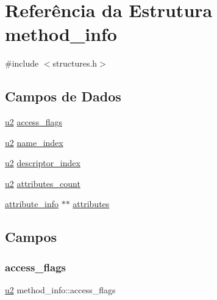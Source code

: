 \hypertarget{structmethod__info}{}\section{Referência da Estrutura method\+\_\+info}
\label{structmethod__info}


{\ttfamily \#include $<$structures.\+h$>$}

\subsection*{Campos de Dados}
\begin{DoxyCompactItemize}
\item 
\hyperlink{lista__operandos_8h_a732cde1300aafb73b0ea6c2558a7a54f}{u2} \hyperlink{structmethod__info_a3b657027a141cdbc94ded28607c98be5}{access\+\_\+flags}
\item 
\hyperlink{lista__operandos_8h_a732cde1300aafb73b0ea6c2558a7a54f}{u2} \hyperlink{structmethod__info_ab91d62d0658b77bba83f6bb685e3bbb9}{name\+\_\+index}
\item 
\hyperlink{lista__operandos_8h_a732cde1300aafb73b0ea6c2558a7a54f}{u2} \hyperlink{structmethod__info_a7713103e0c8d060630ad62774fb9be37}{descriptor\+\_\+index}
\item 
\hyperlink{lista__operandos_8h_a732cde1300aafb73b0ea6c2558a7a54f}{u2} \hyperlink{structmethod__info_ad9e5e1e2fc850806addadd6deab8565d}{attributes\+\_\+count}
\item 
\hyperlink{structattribute__info}{attribute\+\_\+info} $\ast$$\ast$ \hyperlink{structmethod__info_ab6e323f51c4f05e92c09e3ac5e7e07dc}{attributes}
\end{DoxyCompactItemize}


\subsection{Campos}
\mbox{\label{structmethod__info_a3b657027a141cdbc94ded28607c98be5}} 
\subsubsection{\texorpdfstring{access\+\_\+flags}{access\_flags}}
{\footnotesize\ttfamily \hyperlink{lista__operandos_8h_a732cde1300aafb73b0ea6c2558a7a54f}{u2} method\+\_\+info\+::access\+\_\+flags}

